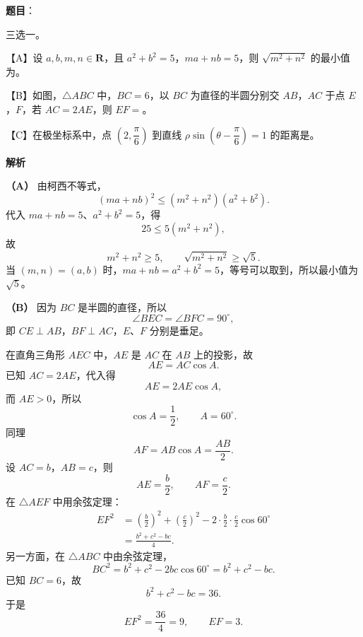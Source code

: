 \begin{answer}

\textbf{题目}：

三选一。

【A】设 $a,b,m,n\in\mathbf R$，且 $a^2+b^2=5$，$ma+nb=5$，则 $\sqrt{m^2+n^2}$ 的最小值为\gkblank{}。

【B】如图，$\triangle ABC$ 中，$BC=6$，以 $BC$ 为直径的半圆分别交 $AB$，$AC$ 于点 $E$，$F$，若 $AC=2AE$，则 $EF=$\gkblank{}。
\nopagebreak[4]
\begin{center}\end{center}
\nopagebreak[4]
【C】在极坐标系中，点 $\left(2,\dfrac\pi6\right)$ 到直线 $\rho\sin\left(\theta-\dfrac\pi6\right)=1$ 的距离是\gkblank{}。

\textbf{解析}

\textbf{（A）} 由柯西不等式，
\nopagebreak[4]
\[(ma+nb)^2\leqslant(m^2+n^2)(a^2+b^2).\]
代入 $ma+nb=5$、$a^2+b^2=5$，得
\nopagebreak[4]
\[25\leqslant5(m^2+n^2),\]
故
\nopagebreak[4]
\[m^2+n^2\geqslant5,\qquad \sqrt{m^2+n^2}\geqslant\sqrt5.\]
当 $(m,n)=(a,b)$ 时，$ma+nb=a^2+b^2=5$，等号可以取到，所以最小值为 $\sqrt5$。

\textbf{（B）} 因为 $BC$ 是半圆的直径，所以
\nopagebreak[4]
\[\angle BEC=\angle BFC=90^\circ,\]
即 $CE\perp AB$，$BF\perp AC$，$E$、$F$ 分别是垂足。

在直角三角形 $AEC$ 中，$AE$ 是 $AC$ 在 $AB$ 上的投影，故
\nopagebreak[4]
\[AE=AC\cos A.\]
已知 $AC=2AE$，代入得
\nopagebreak[4]
\[AE=2AE\cos A,\]
而 $AE>0$，所以
\nopagebreak[4]
\[\cos A=\frac12,\qquad A=60^\circ.\]
同理
\nopagebreak[4]
\[AF=AB\cos A=\frac{AB}{2}.\]
设 $AC=b$，$AB=c$，则
\nopagebreak[4]
\[AE=\frac b2,\qquad AF=\frac c2.\]
在 $\triangle AEF$ 中用余弦定理：
\nopagebreak[4]
\[\begin{aligned}
EF^2&=\left(\frac b2\right)^2+\left(\frac c2\right)^2
-2\cdot\frac b2\cdot\frac c2\cos60^\circ\\
&=\frac{b^2+c^2-bc}{4}.
\end{aligned}\]
另一方面，在 $\triangle ABC$ 中由余弦定理，
\nopagebreak[4]
\[BC^2=b^2+c^2-2bc\cos60^\circ=b^2+c^2-bc.\]
已知 $BC=6$，故
\nopagebreak[4]
\[b^2+c^2-bc=36.\]
于是
\nopagebreak[4]
\[EF^2=\frac{36}{4}=9,\qquad EF=3.\]


\end{answer}
